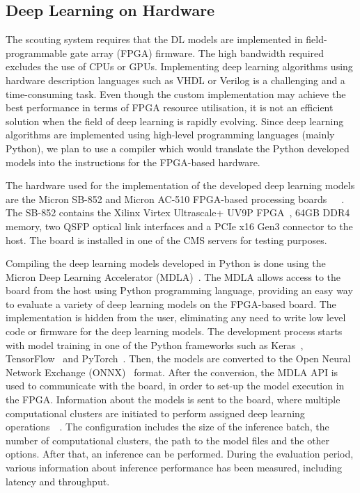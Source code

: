 \documentclass[10pt, paper=a4, UKenglish]{article}
\begin{document}

\subsection{Deep Learning on Hardware}

The scouting system requires that the DL models are implemented in field-programmable gate array (FPGA) firmware. The high bandwidth required excludes the use of CPUs or GPUs. Implementing deep learning algorithms using hardware description languages such as VHDL or Verilog is a challenging and a time-consuming task. Even though the custom implementation may achieve the best performance in terms of FPGA resource utilisation, it is not an efficient solution when the field of deep learning is rapidly evolving. Since deep learning algorithms are implemented using high-level programming languages (mainly Python), we plan to use a compiler which would translate the Python developed models into the instructions for the FPGA-based hardware.

The hardware used for the implementation of the developed deep learning models are the Micron SB-852 and Micron AC-510 FPGA-based processing boards~\cite{micron_company}~\cite{micron_sb852}~\cite{micron_ac510}. The SB-852 contains the Xilinx Virtex Ultrascale+ UV9P FPGA~\cite{vu9p}, 64GB DDR4 memory, two QSFP optical link interfaces and a PCIe x16 Gen3 connector to the host. The board is installed in one of the CMS servers for testing purposes.

Compiling the deep learning models developed in Python is done using the Micron Deep Learning Accelerator (MDLA)~\cite{micron_sdk}. The MDLA allows access to the board from the host using Python programming language, providing an easy way to evaluate a variety of deep learning models on the FPGA-based board. The implementation is hidden from the user, eliminating any need to write low level code or firmware for the deep learning models. The development process starts with model training in one of the Python frameworks such as Keras~\cite{keras}, TensorFlow~\cite{tf} and PyTorch~\cite{pytorch}. Then, the models are converted to the Open Neural Network Exchange (ONNX)~\cite{onnx} format. After the conversion, the MDLA API is used to communicate with the board, in order to set-up the model execution in the FPGA. Information about the models is sent to the board, where multiple computational clusters are initiated to perform assigned deep learning operations~\cite{mircon_paper_1}~\cite{mircon_paper_2}. The configuration includes the size of the inference batch, the number of computational clusters, the path to the model files and the other options. After that, an inference can be performed. During the evaluation period, various information about inference performance has been measured, including latency and throughput.
\end{document}
